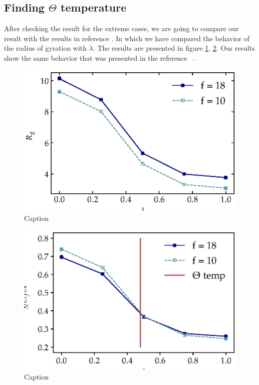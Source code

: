 \subsection{Finding $\Theta$ temperature}
After checking the result for the extreme cases, we are going to compare our result with the results in reference \cite{Huissmann2009}. In which we have compared the behavior of the radius of gyration with $\lambda$. The results are presented in figure \ref{fig:test}, \ref{fig:tes:normal}. Our results show the same behavior that was presented in the reference ~\cite{Huissmann2009}.
\begin{figure}
    \centering
    \includegraphics{figures/test_1.eps}
    \caption{Caption}
    \label{fig:test}
\end{figure}
\begin{figure}
    \centering
    \includegraphics{figures/test_1_normalized.eps}
    \caption{Caption}
    \label{fig:tes:normal}
\end{figure}


